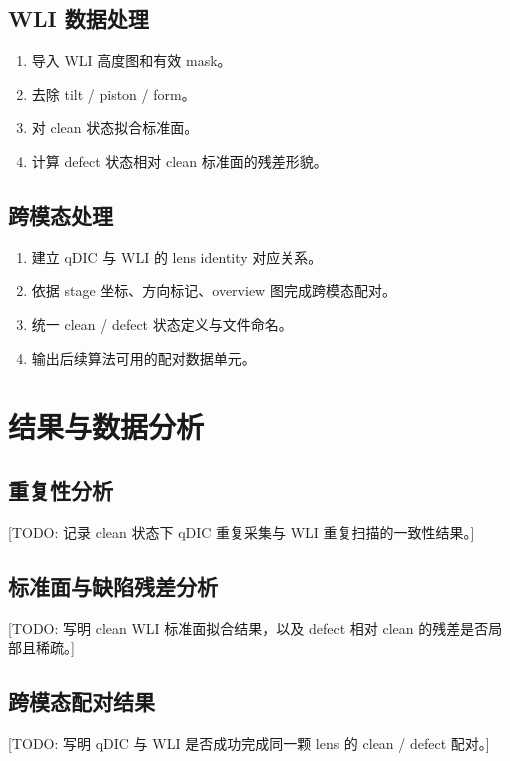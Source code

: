 \documentclass[UTF8,a4paper,11pt]{ctexart}
\newcommand{\TODO}[1]{\textcolor{red!70!black}{[TODO: #1]}}
\begin{document}
\subsection{WLI 数据处理}

\begin{enumerate}
  \item 导入 WLI 高度图和有效 mask。
  \item 去除 tilt / piston / form。
  \item 对 clean 状态拟合标准面。
  \item 计算 defect 状态相对 clean 标准面的残差形貌。
\end{enumerate}

\subsection{跨模态处理}

\begin{enumerate}
  \item 建立 qDIC 与 WLI 的 lens identity 对应关系。
  \item 依据 stage 坐标、方向标记、overview 图完成跨模态配对。
  \item 统一 clean / defect 状态定义与文件命名。
  \item 输出后续算法可用的配对数据单元。
\end{enumerate}

\section{结果与数据分析}

\subsection{重复性分析}

\TODO{记录 clean 状态下 qDIC 重复采集与 WLI 重复扫描的一致性结果。}

\subsection{标准面与缺陷残差分析}

\TODO{写明 clean WLI 标准面拟合结果，以及 defect 相对 clean 的残差是否局部且稀疏。}

\subsection{跨模态配对结果}

\TODO{写明 qDIC 与 WLI 是否成功完成同一颗 lens 的 clean / defect 配对。}
\end{document}
